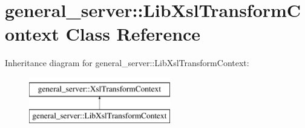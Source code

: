 \hypertarget{classgeneral__server_1_1LibXslTransformContext}{\section{general\-\_\-server\-:\-:\-Lib\-Xsl\-Transform\-Context \-Class \-Reference}
\label{classgeneral__server_1_1LibXslTransformContext}
}
\-Inheritance diagram for general\-\_\-server\-:\-:\-Lib\-Xsl\-Transform\-Context\-:\begin{figure}[H]
\begin{center}
\leavevmode
\includegraphics[height=2.000000cm]{classgeneral__server_1_1LibXslTransformContext}
\end{center}
\end{figure}

